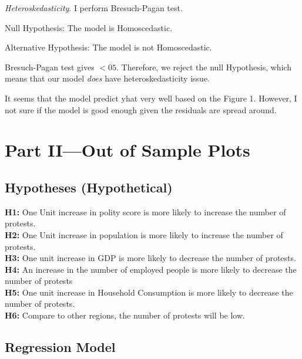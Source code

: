 \documentclass[12pt]{article}
\begin{document}
\textit{Heteroskedasticity}. I perform Bresuch-Pagan test. 

Null Hypothesis: The model is Homoscedastic. 

Alternative Hypothesis: The model is not Homoscedastic.

Bresuch-Pagan test gives $<05$. Therefore, we reject the null Hypothesis, which means that our model \textit{does} have heteroskedasticity issue.


It seems that the model predict yhat very well based on the Figure 1. However,  I not sure if the model is good enough given the residuals are spread around.  
\vspace{1cm}

\section{Part II—Out of Sample Plots}

\vspace{0.5cm}

\subsection{Hypotheses (Hypothetical)}


\textbf{H1:} One Unit increase in polity score is more likely to increase the number of protests. \\

\textbf{H2:} One Unit increase in population is more likely to increase the number of protests.\\

\textbf{H3:} One unit increase in GDP is more likely to decrease the number of protests.\\

\textbf{H4:} An increase in the number of employed people is more likely to decrease the number of protests\\

\textbf{H5:} One unit increase in Household Consumption is more likely to decrease the number of protests.\\

\textbf{H6: } Compare to other regions, the number of protests will be low.

\subsection{Regression Model}
\end{document}
